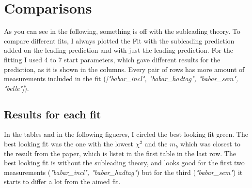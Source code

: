 \documentclass[a4paper,12pt]{article}
\begin{document}
\section{Comparisons}
As you can see in the following, something is off with the subleading theory. To compare different fits, I always plotted the Fit with the subleading prediction added on the leading prediction and with just the leading prediction.
For the fitting I used 4 to 7 start parameters, which gave different results for the prediction, as it is shown in the columns.
Every pair of rows has more amount of measurements included in the fit (\textit{["babar\_incl", "babar\_hadtag", "babar\_sem", "belle"]}).\\
\subsection{Results for each fit}
In the tables and in the following figueres, I circled the best looking fit green. The best looking fit was the one with the lowest $\chi^2$ and the $m_b$ which was closest to the result from the paper, which is listet in the first table in the last row.
The best looking fit is without the subleading theory, and looks good for the first two measurements (\textit{"babar\_incl", "babar\_hadtag"}) but for the third (\textit{"babar\_sem"}) it starts to differ a lot from the aimed fit.
\end{document}

